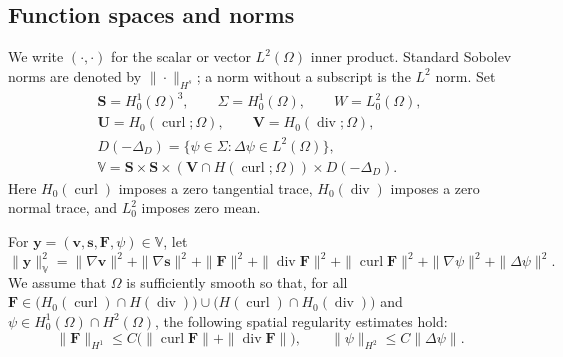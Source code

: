 \documentclass[11pt,a4paper]{article}
\newcommand{\bs}{\boldsymbol}
\newcommand{\dt}{\Delta t}
\DeclareMathOperator{\curl}{curl}
\DeclareMathOperator{\ddiv}{div}
\newcommand{\Div}{\ddiv}
\newcommand{\V}{\mathbb V}
\theoremstyle{definition}
\numberwithin{equation}{section}
\begin{document}
\subsection{Function spaces and norms}
We write $(\cdot,\cdot)$ for the scalar or vector $L^2(\Omega)$ inner product. Standard Sobolev norms are denoted by $\|\cdot\|_{H^s}$; a norm without a subscript is the $L^2$ norm. Set
\begin{gather*}
 \bs S=H_0^1(\Omega)^3,\qquad \Sigma=H_0^1(\Omega),\qquad W=L_0^2(\Omega),\\
 \bs U=H_0(\curl;\Omega),\qquad\bs V=H_0(\Div;\Omega),\\
 D(-\Delta_D)=\{\psi\in\Sigma:\Delta\psi\in L^2(\Omega)\},\\
 \V=\bs S\times\bs S\times(\bs V\cap H(\curl;\Omega))\times D(-\Delta_D).
\end{gather*}
Here $H_0(\curl)$ imposes a zero tangential trace, $H_0(\Div)$ imposes a zero normal trace, and $L_0^2$ imposes zero mean. 

For $\bs y=(\bs v,\bs s,\bs F,\psi)\in\V$, let
\begin{equation}\label{eq:Vnorm}
 \|\bs y\|_{\V}^2=
 \|\nabla\bs v\|^2+\|\nabla\bs s\|^2+\|\bs F\|^2
 +\|\Div\bs F\|^2+\|\curl\bs F\|^2
 +\|\nabla\psi\|^2+\|\Delta\psi\|^2.
\end{equation}
We assume that 
$\Omega$ is sufficiently smooth so that, for all $\bs F\in \bigl(H_0(\curl)\cap H(\Div)\bigr)\cup\bigl(H(\curl)\cap H_0(\Div)\bigr)$ and $\psi \in H_0^1(\Omega) \cap H^2(\Omega)$, the following spatial regularity estimates hold: 
\begin{equation}\label{eq:domain-reg}
 \|\bs F\|_{H^1}\le C\bigl(\|\curl\bs F\|+\|\Div\bs F\|\bigr),
 \qquad
 \|\psi\|_{H^2}\le C\|\Delta\psi\|.
\end{equation}
\end{document}

